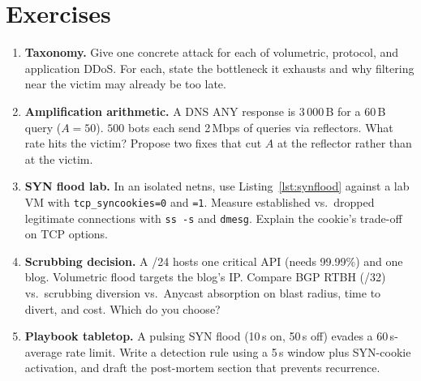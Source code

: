 \section{Exercises}\label{sec:ch05-exercises}
\begin{enumerate}[label=E5.\arabic*, leftmargin=*, itemsep=0.6em]
    \item \textbf{Taxonomy.} Give one concrete attack for each of volumetric, protocol, and application DDoS. For each, state the bottleneck it exhausts and why filtering near the victim may already be too late.
    \item \textbf{Amplification arithmetic.} A DNS ANY response is 3\,000\,B for a 60\,B query ($A=50$). $500$ bots each send 2\,Mbps of queries via reflectors. What rate hits the victim? Propose two fixes that cut $A$ at the reflector rather than at the victim.
    \item \textbf{SYN flood lab.} In an isolated netns, use Listing~\ref{lst:synflood} against a lab VM with \texttt{tcp\_syncookies=0} and \texttt{=1}. Measure established vs.\ dropped legitimate connections with \texttt{ss -s} and \texttt{dmesg}. Explain the cookie's trade-off on TCP options.
    \item \textbf{Scrubbing decision.} A /24 hosts one critical API (needs 99.99\%) and one blog. Volumetric flood targets the blog's IP. Compare BGP RTBH (/32) vs.\ scrubbing diversion vs.\ Anycast absorption on blast radius, time to divert, and cost. Which do you choose?
    \item \textbf{Playbook tabletop.} A pulsing SYN flood (10\,s on, 50\,s off) evades a 60\,s-average rate limit. Write a detection rule using a 5\,s window plus SYN-cookie activation, and draft the post-mortem section that prevents recurrence.
\end{enumerate}

